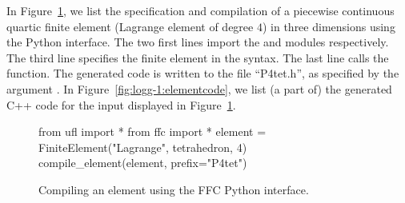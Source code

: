 In Figure~\ref{fig:logg-1:python:element}, we list the specification and
compilation of a piecewise continuous quartic finite element (Lagrange
element of degree $4$) in three dimensions using the
\ffc{} Python interface. The two first lines import the \ufl{}
and \ffc{} modules respectively. The third line specifies the finite
element in the \ufl{} syntax. The last line calls the \ffc{}
 function. The generated code is written to
the file ``P4tet.h'', as specified by the argument . In
Figure~\ref{fig:logg-1:elementcode}, we list (a part of) the generated
C++ code for the input displayed in Figure~\ref{fig:logg-1:python:element}.

\begin{figure}
  \begin{python}
from ufl import *
from ffc import *
element = FiniteElement("Lagrange", tetrahedron, 4)
compile_element(element, prefix="P4tet")
  \end{python}
  \caption{Compiling an element using the FFC Python interface.}
  \label{fig:logg-1:python:element}
\end{figure}

